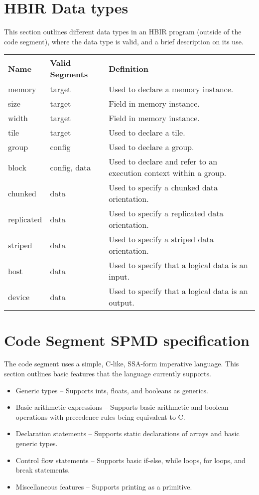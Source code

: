 \documentclass{article}
\begin{document}
\section{HBIR Data types}
This section outlines different data types in an HBIR program (outside of the code segment), where the data type is valid, and a brief description on its use.

\begin{center}
\begin{tabular}{ | m | m | m | } 
\hline
Name & Valid Segments & Definition \\ 
\hline
memory & target & Used to declare a memory instance. \\ 
\hline
size & target & Field in memory instance. \\ 
\hline
width & target & Field in memory instance. \\ 
\hline
tile & target & Used to declare a tile. \\ 
\hline
group & config & Used to declare a group. \\ 
\hline
block & config, data & Used to declare and refer to an execution context within a group. \\ 
\hline
chunked & data & Used to specify a chunked data orientation. \\ 
\hline
replicated & data & Used to specify a replicated data orientation. \\ 
\hline
striped & data & Used to specify a striped data orientation. \\ 
\hline
host & data & Used to specify that a logical data is an input. \\ 
\hline
device & data & Used to specify that a logical data is an output. \\ 
\hline
\end{tabular}
\end{center}

\section{Code Segment SPMD specification}
The code segment uses a simple, C-like, SSA-form imperative language. This section outlines basic features that the language currently supports. 

\begin{itemize}
    \item Generic types -- Supports ints, floats, and booleans as generics.
    \item Basic arithmetic expressions -- Supports basic arithmetic and boolean operations with precedence rules being equivalent to C.
    \item Declaration statements -- Supports static declarations of arrays and basic generic types. 
    \item Control flow statements -- Supports basic if-else, while loops, for loops, and break statements.
    \item Miscellaneous features -- Supports printing as a primitive.
\end{itemize}
\end{document}

